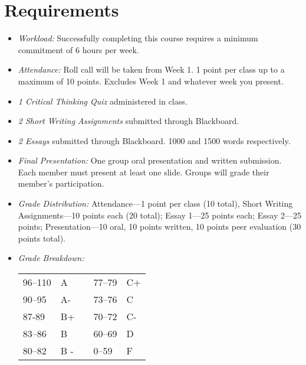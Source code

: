 \documentclass[11pt,article,oneside]{memoir}
\begin{document}
\section{Requirements}

\begin{itemize}
\item \textit{Workload:} Successfully completing this course requires a minimum commitment of 6 hours per week. 

\item \textit{Attendance:} Roll call will be taken from Week 1. 1 point per class up to a maximum of 10 points. Excludes Week 1 and whatever week you present.

\item \textit{1 Critical Thinking Quiz} administered in class. 

\item \textit{2 Short Writing Assignments} submitted through Blackboard. 

\item \textit{2 Essays} submitted through Blackboard. 1000 and 1500 words respectively.

\item \textit{Final Presentation:} One group oral presentation and written submission. Each member must present at least one slide. Groups will grade their member's participation. 

\item \textit{Grade Distribution:}  Attendance---1 point per class (10 total),  Short Writing Assignments---10 points each (20 total); Essay 1---25 points each; Essay 2---25 points; Presentation---10 oral, 10 points written, 10 points peer evaluation (30 points total).

\item \textit{Grade Breakdown:}

 \begin{tabular}{ | l | l | p{2cm} | l | l | }
    \hline 
96--110 & A  & &  77--79 &  C+ \\  
90--95 & A- & &  73--76 & C \\
87-89 & B+ &  &  70--72 & C- \\ 
83--86 & B  & &  60--69 & D\\
80--82 & B - & & 0--59 & F\\ \hline
    \end{tabular}


\end{itemize}
\end{document}

